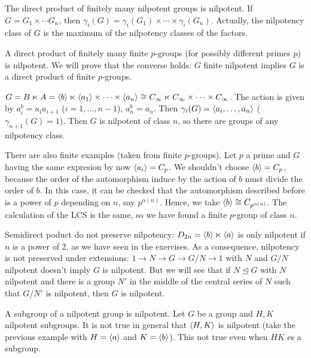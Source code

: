 \documentclass[twoside, 11pt]{article}
\begin{document}
\begin{ej}
The direct product of finitely many nilpotent groups is nilpotent. If $G=G_1\times\cdots G_n$, then $\gamma_i(G)=\gamma_i(G_1)\times\cdots\times \gamma_i(G_n)$. Actually, the nilpotency class of $G$ is the maximum of the nilpotency classes of the factors.
\end{ej}

\begin{ej}
A direct product of finitely many finite $p$-groups (for possibly different primes $p$) is nilpotent. We will prove that the converse holds: $G$ finite nilpotent implies $G$ is a direct product of finite $p$-groups. 
\end{ej}

\begin{ej}
$G=B\ltimes A=\langle{b}\rangle\ltimes \langle{a_1}\rangle\times\cdots\times\langle{a_n}\rangle\cong C_\infty\ltimes C_\infty\times\cdots\times C_\infty$. The action is given by $a_i^b=a_ia_{i+1}$ ($i=1,\dots, n-1$), $a_n^b=a_n$. Then $\gamma_i(G)=\langle{a_i,\dots, a_n}\rangle$ ($\gamma_{n+1}(G)=1$). Then $G$ is nilpotent of class $n$, so there are groups of any nilpotency class. 

There are also finite examples (taken from finite $p$-groups). Let $p$ a prime and $G$ having the same expresion by now $\langle{a_i}\rangle=C_p$. We shouldn't choose $\langle{b}\rangle=C_p$, because the order of the automorphism induce by the action of $b$ must divide the order of $b$. In this case, it can be checked that the automorphism described before is a power of $p$ depending on $n$, say $p^{\alpha(n)}$. Hence, we take $\langle{b}\rangle\cong C_{p^{\alpha(n)}}$. The calculation of the LCS is the same, so we have found a finite $p$-group of class $n$.  
\end{ej}

\begin{ej}
Semidirect poduct do not preserve nilpotency: $D_{2n}=\langle{b}\rangle\ltimes\langle{a}\rangle$ is only nilpotent if $n$ is a power of 2, as we have seen in the exercises. As a consequence, nilpotency is not preserved under extensions: $1\to N\to G\to G/N\to 1$ with $N$ and $G/N$ nilpotent doesn't imply $G$ is nilpotent. But we will see that if $N\trianglelefteq G$ with $N$ nilpotent and there is a group $N'$ in the middle of the central series of $N$ such that $G/N'$ is nilpotent, then $G$ is nilpotent.
\end{ej}

\begin{ej}
A subgroup of a nilpotent group is nilpotent. Let $G$ be a group and $H,K$ nilpotent subgroups. It is not true in general that $\langle{H,K}\rangle$ is nilpotent (take the previous example with $H=\langle{a}\rangle$ and $K=\langle{b}\rangle$). This not true even when $HK$ es a subgroup.
\end{ej}
\end{document}
